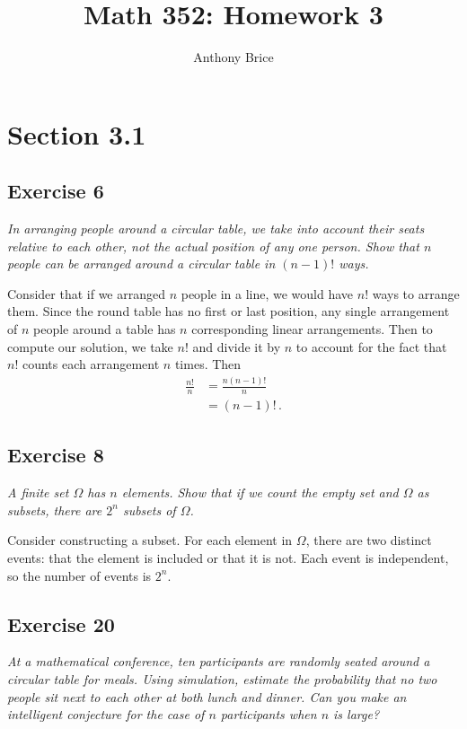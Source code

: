 \documentclass{tufte-handout}
\title{Math 352: Homework 3}
\author{Anthony Brice}
\begin{document}
\maketitle
\section{Section 3.1}
\subsection{Exercise 6}
\begin{description}
\item \emph{In arranging people around a circular table, we take into
    account their seats relative to each other, not the actual
    position of any one person. Show that $n$ people can be arranged
    around a circular table in $(n - 1)!$ ways.}
\end{description}

Consider that if we arranged $n$ people in a line, we would have $n!$
ways to arrange them. Since the round table has no first or last
position, any single arrangement of $n$ people around a table has $n$
corresponding linear arrangements. Then to compute our solution, we
take $n!$ and divide it by $n$ to account for the fact that $n!$
counts each arrangement $n$ times. Then
\begin{align*}
\frac{n!}{n} &= \frac{n(n-1)!}{n}\\
&= (n-1)! \, .
\end{align*}

\subsection{Exercise 8}
\begin{description}
\item \emph{A finite set $\Omega$ has $n$ elements. Show that if we
    count the empty set and $\Omega$ as subsets, there are $2^n$ subsets
    of $\Omega$.}
\end{description}

Consider constructing a subset. For each element in $\Omega$, there
are two distinct events: that the element is included or that it is
not. Each event is independent, so the number of events is $2^n$.

\subsection{Exercise 20}
\begin{description}
\item \emph{At a mathematical conference, ten participants are
    randomly seated around a circular table for meals. Using
    simulation, estimate the probability that no two people sit next
    to each other at both lunch and dinner. Can you make an
    intelligent conjecture for the case of $n$ participants when $n$
    is large?}
\end{description}
\end{document}
